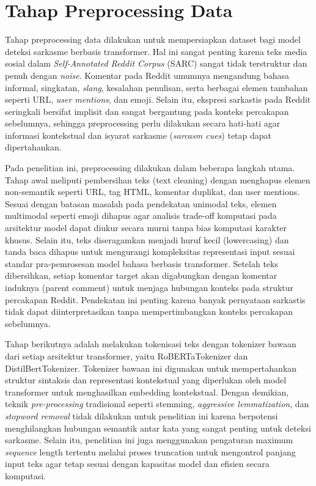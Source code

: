 \section{Tahap Preprocessing Data}

Tahap preprocessing data dilakukan untuk mempersiapkan dataset bagi model deteksi sarkasme berbasis transformer. Hal ini sangat penting karena teks media sosial dalam \textit{Self-Annotated Reddit Corpus} (SARC) sangat tidak terstruktur dan penuh dengan \textit{noise}. Komentar pada Reddit umumnya mengandung bahasa informal, singkatan, \textit{slang}, kesalahan penulisan, serta berbagai elemen tambahan seperti URL, \textit{user mentions}, dan emoji. Selain itu, ekspresi sarkastis pada Reddit seringkali bersifat implisit dan sangat bergantung pada konteks percakapan sebelumnya, sehingga preprocessing perlu dilakukan secara hati-hati agar informasi kontekstual dan isyarat sarkasme (\textit{sarcasm cues}) tetap dapat dipertahankan.

Pada penelitian ini, preprocessing dilakukan dalam beberapa langkah utama. Tahap awal meliputi pembersihan teks (text cleaning) dengan menghapus elemen non-semantik seperti URL, tag HTML, komentar duplikat, dan user mentions. Sesuai dengan batasan masalah pada pendekatan unimodal teks, elemen multimodal seperti emoji dihapus agar analisis trade-off komputasi pada arsitektur model dapat diukur secara murni tanpa bias komputasi karakter khusus. Selain itu, teks diseragamkan menjadi huruf kecil (lowercasing) dan tanda baca dihapus untuk mengurangi kompleksitas representasi input sesuai standar pra-pemrosesan model bahasa berbasis transformer. Setelah teks dibersihkan, setiap komentar target akan digabungkan dengan komentar induknya (parent comment) untuk menjaga hubungan konteks pada struktur percakapan Reddit. Pendekatan ini penting karena banyak pernyataan sarkastis tidak dapat diinterpretasikan tanpa mempertimbangkan konteks percakapan sebelumnya\cite{dubey2025unpacking, dubey2026efficient}.

Tahap berikutnya adalah melakukan tokenisasi teks dengan tokenizer bawaan dari setiap arsitektur transformer, yaitu RoBERTaTokenizer dan DistilBertTokenizer. Tokenizer bawaan ini digunakan untuk mempertahankan struktur sintaksis dan representasi kontekstual yang diperlukan oleh model transformer untuk menghasilkan embedding kontekstual. Dengan demikian, teknik \textit{pre-processing} tradisional seperti stemming, \textit{aggressive lemmatization}, dan \textit{stopword removal} tidak dilakukan untuk penelitian ini karena berpotensi menghilangkan hubungan semantik antar kata yang sangat penting untuk deteksi sarkasme. Selain itu, penelitian ini juga menggunakan pengaturan maximum \textit{sequence} length tertentu melalui proses truncation untuk mengontrol panjang input teks agar tetap sesuai dengan kapasitas model dan efisien secara komputasi.

